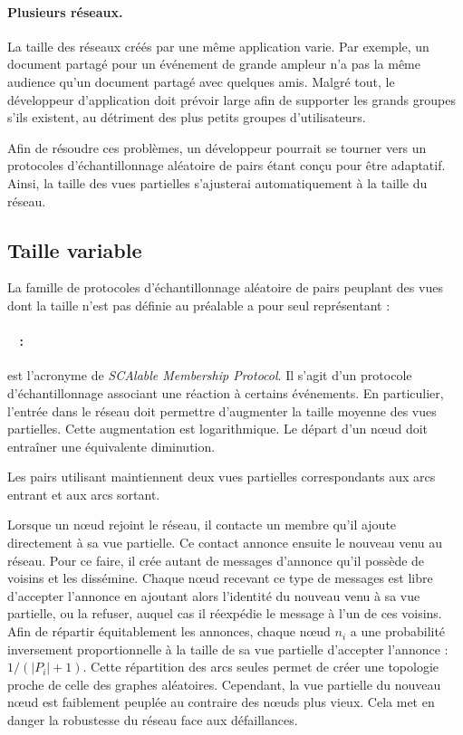 \paragraph{Plusieurs réseaux.} La taille des réseaux créés par une même
application varie. Par exemple, un document partagé pour un événement de grande
ampleur n'a pas la même audience qu'un document partagé avec quelques
amis. Malgré tout, le développeur d'application doit prévoir large afin de
supporter les grands groupes s'ils existent, au détriment des plus petits
groupes d'utilisateurs.



Afin de résoudre ces problèmes, un développeur pourrait se tourner vers un
protocoles d'échantillonnage aléatoire de pairs étant conçu pour être adaptatif.
Ainsi, la taille des vues partielles s'ajusterai automatiquement à la taille du
réseau.

\subsection{Taille variable}
\label{net:subsec:variable}

La famille de protocoles d'échantillonnage aléatoire de pairs peuplant des vues
dont la taille n'est pas définie au préalable a pour seul représentant :

\paragraph{\SCAMP~\cite{ganesh2001scamp, ganesh2003peer} :} est l'acronyme de
\emph{SCAlable Membership Protocol}. Il s'agit d'un protocole d'échantillonnage
associant une réaction à certains événements. En particulier, l'entrée dans le
réseau doit permettre d'augmenter la taille moyenne des vues partielles. Cette
augmentation est logarithmique. Le départ d'un nœud doit entraîner une
équivalente diminution.

\noindent Les pairs utilisant \SCAMP maintiennent deux vues partielles
correspondants aux arcs entrant et aux arcs sortant.

\noindent Lorsque un nœud rejoint le réseau, il contacte un membre qu'il ajoute
directement à sa vue partielle. Ce contact annonce ensuite le nouveau venu au
réseau. Pour ce faire, il crée autant de messages d'annonce qu'il possède de
voisins et les dissémine. Chaque nœud recevant ce type de messages est libre
d'accepter l'annonce en ajoutant alors l'identité du nouveau venu à sa vue
partielle, ou la refuser, auquel cas il réexpédie le message à l'un de ces
voisins. Afin de répartir équitablement les annonces, chaque nœud $n_i$ a une
probabilité inversement proportionnelle à la taille de sa vue partielle
d'accepter l'annonce : $1/(|P_i|+1)$. Cette répartition des arcs seules permet
de créer une topologie proche de celle des graphes aléatoires. Cependant, la vue
partielle du nouveau nœud est faiblement peuplée au contraire des nœuds plus
vieux. Cela met en danger la robustesse du réseau face aux défaillances.

